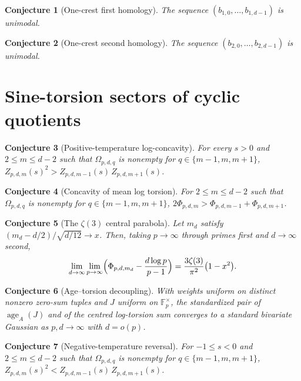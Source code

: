 \documentclass[11pt]{article}
\newtheorem{conjecture}{Conjecture}
\theoremstyle{definition}
\begin{document}
\begin{conjecture}[One-crest first homology]\label{z9}
The sequence $(b_{1,0},\ldots,b_{1,d-1})$ is unimodal.
\end{conjecture}

\begin{conjecture}[One-crest second homology]\label{z10}
The sequence $(b_{2,0},\ldots,b_{2,d-1})$ is unimodal.
\end{conjecture}

\section{Sine-torsion sectors of cyclic quotients}

\begin{conjecture}[Positive-temperature log-concavity]\label{z11}
For every $s>0$ and $2\le m\le d-2$ such that $\Omega_{p,d,q}$ is nonempty for $q\in\{m-1,m,m+1\}$, $Z_{p,d,m}(s)^2>Z_{p,d,m-1}(s)\,Z_{p,d,m+1}(s)$.
\end{conjecture}

\begin{conjecture}[Concavity of mean log torsion]\label{z12}
For $2\le m\le d-2$ such that $\Omega_{p,d,q}$ is nonempty for $q\in\{m-1,m,m+1\}$, $2\Phi_{p,d,m}>\Phi_{p,d,m-1}+\Phi_{p,d,m+1}$.
\end{conjecture}

\begin{conjecture}[The $\zeta(3)$ central parabola]\label{z13}
Let $m_d$ satisfy $(m_d-d/2)/\sqrt{d/12}\to x$.  Then, taking $p\to\infty$ through primes first and $d\to\infty$ second,
\[
\lim_{d\to\infty}\lim_{p\to\infty}\Bigl(\Phi_{p,d,m_d}-\frac{d\log p}{p-1}\Bigr)=\frac{3\zeta(3)}{\pi^2}\bigl(1-x^2\bigr).
\]
\end{conjecture}

\begin{conjecture}[Age--torsion decoupling]\label{z14}
With weights uniform on distinct nonzero zero-sum tuples and $J$ uniform on $\mathbb F_p^\times$, the standardized pair of $\operatorname{age}_A(J)$ and of the centred log-torsion sum converges to a standard bivariate Gaussian as $p,d\to\infty$ with $d=o(p)$.
\end{conjecture}

\begin{conjecture}[Negative-temperature reversal]\label{z15}
For $-1\le s<0$ and $2\le m\le d-2$ such that $\Omega_{p,d,q}$ is nonempty for $q\in\{m-1,m,m+1\}$, $Z_{p,d,m}(s)^2<Z_{p,d,m-1}(s)\,Z_{p,d,m+1}(s)$.
\end{conjecture}
\end{document}

